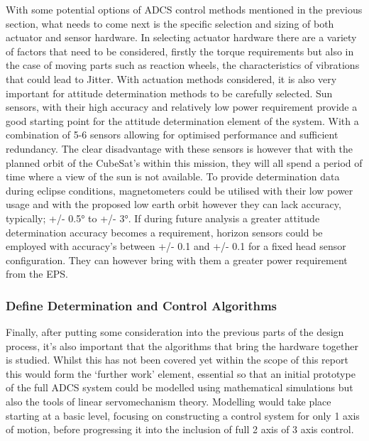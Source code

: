 With some potential options of ADCS control methods mentioned in the previous section, what needs to come next is the specific selection and sizing of both actuator and sensor hardware. In selecting actuator hardware there are a variety of factors that need to be considered, firstly the torque requirements but also in the case of moving parts such as reaction wheels, the characteristics of vibrations that could lead to Jitter.
With actuation methods considered, it is also very important for attitude determination methods to be carefully selected. Sun sensors, with their high accuracy and relatively low power requirement provide a good starting point for the attitude determination element of the system. With a combination of 5-6 sensors allowing for optimised performance and sufficient redundancy. \cite{Delfi-n3xt} The clear disadvantage with these sensors is however that with the planned orbit of the CubeSat’s within this mission, they will all spend a period of time where a view of the sun is not available. To provide determination data during eclipse conditions, magnetometers could be utilised with their low power usage and with the proposed low earth orbit however they can lack accuracy, typically; +/- 0.5° to +/- 3°. If during future analysis a greater attitude determination accuracy becomes a requirement, horizon sensors could be employed with accuracy’s between +/- 0.1 and +/- 0.1 for a fixed head sensor configuration. They can however bring with them a greater power requirement from the EPS.

\subsubsection{Define Determination and Control Algorithms}

Finally, after putting some consideration into the previous parts of the design process, it’s also important that the algorithms that bring the hardware together is studied. Whilst this has not been covered yet within the scope of this report this would form the ‘further work’ element, essential so that an initial prototype of the full ADCS system could be modelled using mathematical simulations but also the tools of linear servomechanism theory. Modelling would take place starting at a basic level, focusing on constructing a control system for only 1 axis of motion, before progressing it into the inclusion of full 2 axis of 3 axis control.
